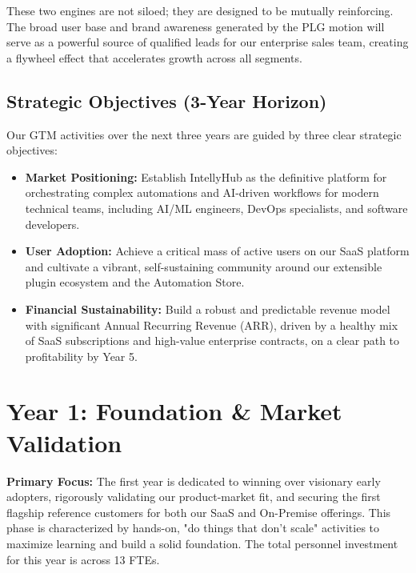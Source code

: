 \documentclass[11pt, a4paper, oneside]{article}
\begin{document}
These two engines are not siloed; they are designed to be mutually reinforcing. The broad user base and brand awareness generated by the PLG motion will serve as a powerful source of qualified leads for our enterprise sales team, creating a flywheel effect that accelerates growth across all segments.

\subsection{Strategic Objectives (3-Year Horizon)}
Our GTM activities over the next three years are guided by three clear strategic objectives:

\begin{itemize}
    \item \textbf{Market Positioning:} Establish IntellyHub as the definitive platform for orchestrating complex automations and AI-driven workflows for modern technical teams, including AI/ML engineers, DevOps specialists, and software developers.
    \item \textbf{User Adoption:} Achieve a critical mass of active users on our SaaS platform and cultivate a vibrant, self-sustaining community around our extensible plugin ecosystem and the Automation Store.
    \item \textbf{Financial Sustainability:} Build a robust and predictable revenue model with significant Annual Recurring Revenue (ARR), driven by a healthy mix of SaaS subscriptions and high-value enterprise contracts, on a clear path to profitability by Year 5.
\end{itemize}

\section{Year 1: Foundation \& Market Validation}
\textbf{Primary Focus:} The first year is dedicated to winning over visionary early adopters, rigorously validating our product-market fit, and securing the first flagship reference customers for both our SaaS and On-Premise offerings. This phase is characterized by hands-on, "do things that don't scale" activities to maximize learning and build a solid foundation. The total personnel investment for this year is \textbf{} across 13 FTEs.
\end{document}
